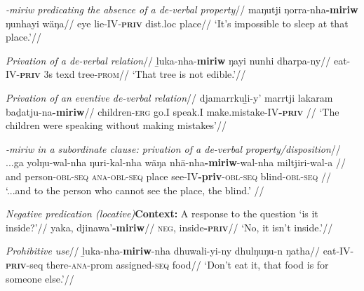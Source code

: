 \documentclass[usenames,dvipsnames,11pt]{article}
\begin{document}
{\a\begingl\glpreamble\textit{\emph{-miriw} predicating the absence of a de-verbal property}//
\gla maŋutji ŋorra-nha\textbf{-miriw} ŋunhayi wäŋa//
\glb eye lie-IV\textsc{-\textbf{priv}} \gls{dist}.\gls{loc} place//
\glft`It's impossible to sleep at that place.'//\endgl


\a\begingl\glpreamble \textit{Privation of a de-verbal relation}// %
\gla ḻuka-nha-\textbf{miriw} ŋayi nunhi dharpa-ny//
\glb eat-IV-\textsc{\textbf{priv}} 3s \gls{texd} tree-\textsc{prom}//
\glft`That tree is not edible.'//\endgl


\a\begingl\glpreamble \textit{Privation of an eventive de-verbal relation}//
\gla djamarrkuḻi-y' marrtji lakaram baḏatju-na\textbf{-miriw}//
\glb children-\textsc{erg} go.I speak.I make.mistake-IV\textsc{\textbf{-priv}}	//
\glft `The children were speaking without making mistakes'//\endgl


\a\begingl\glpreamble \textit{\emph{-miriw} in a subordinate clause: privation of a de-verbal property/disposition}//
\gla ...ga yolŋu-wal-nha ŋuri-kal-nha wäŋa nhä-nha\textbf{-miriw}-wal-nha miltjiri-wal-a   //
\glb and person\textsc{-\gls{obl}-seq} \textsc{ana-obl-seq} place see-IV\textbf{-\gls{priv}}-\textsc{obl-seq} blind\textsc{-obl-seq}	//
\glft`...and to the person who cannot see the place, the blind.' 			//\endgl

\a\begingl\glpreamble\textit{Negative predication (locative)}\qquad \textbf{Context:} A response to the question `is it inside?'//
\gla yaka, djinawa'\textbf{-miriw}//
\glb \textsc{neg}, inside\textsc{\textbf{-priv}}//
\glft`No, it isn't inside.'//\endgl

\a\begingl\glpreamble\textit{ Prohibitive use}//
\gla ḻuka-nha-\textbf{miriw}-nha dhuwali-yi-ny dhulŋuŋu-n ŋatha//
\glb eat-IV-\textsc{\textbf{priv}}-\gls{seq} there-\textsc{ana}-\gls{prom} assigned-\textsc{seq} food//
\glft`Don't eat it, that food is for someone else.'//\endgl



}
\end{document}
